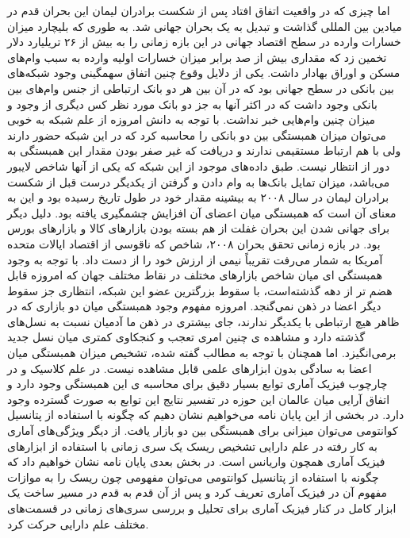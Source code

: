 \documentclass[a4paper,titlepage,12pt,fleqn,oneside]{report}
\begin{document}
	اما چیزی که در واقعیت اتفاق افتاد پس از شکست برادران لیمان این بحران قدم در میادین بین المللی گذاشت و تبدیل به یک بحران جهانی شد.  به طوری که بلیچارد  میزان خسارات وارده در سطح اقتصاد جهانی در این بازه زمانی را به بیش از ۲۶ تریلیارد دلار تخمین زد که مقداری بیش از صد برابر میزان خسارات اولیه وارده به سبب وام‌های مسکن و اوراق بهادار داشت.  
	یکی از دلایل وقوع چنین اتفاق  سهمگینی وجود شبکه‌های بین بانکی در سطح جهانی بود که در آن بین هر دو بانک ارتباطی از جنس وام‌های بین بانکی وجود داشت که در اکثر آنها به جز دو بانک مورد نظر کس دیگری از وجود و میزان چنین وام‌هایی خبر نداشت.  با توجه به دانش امروزه  از علم شبکه به خوبی می‌توان میزان همبستگی بین دو بانکی را محاسبه کرد که در این شبکه حضور دارند ولی با هم ارتباط مستقیمی ندارند و دریافت که غیر صفر بودن مقدار این همبستگی به دور از انتظار نیست.  طبق داده‌های موجود از این شبکه که یکی از آنها شاخص لایبور می‌باشد،  میزان تمایل بانک‌ها به وام دادن و گرفتن از یکدیگر درست قبل از شکست برادران لیمان در سال ۲۰۰۸ به بیشینه مقدار خود در طول تاریخ رسیده بود و این به معنای آن است که همبستگی میان اعضای آن افزایش چشمگیری یافته بود. 
	دلیل دیگر برای جهانی شدن این بحران غفلت از هم بسته بودن بازارهای کالا و بازارهای بورس بود. در بازه زمانی تحقق  بحران ۲۰۰۸،   شاخص  که ناقوسی از اقتصاد ایالات متحده آمریکا به شمار می‌رفت تقریباً نیمی از ارزش خود را از دست داد.  با توجه به وجود همبستگی ای میان شاخص بازارهای مختلف در نقاط مختلف جهان که امروزه قابل هضم تر از دهه گذشته‌است،  با سقوط بزرگترین عضو این شبکه،  انتظاری جز سقوط دیگر اعضا در ذهن نمی‌گنجد.
	امروزه مفهوم وجود همبستگی میان دو بازاری که در ظاهر هیچ ارتباطی با یکدیگر ندارند،  جای بیشتری در ذهن ما آدمیان نسبت به نسل‌های گذشته دارد و مشاهده ی چنین امری تعجب و کنجکاوی کمتری میان نسل جدید برمی‌انگیزد. اما همچنان با توجه به مطالب گفته شده، تشخیص میزان همبستگی میان اعضا به سادگی بدون ابزارهای علمی قابل مشاهده نیست. در علم کلاسیک و در چارچوب فیزیک آماری توابع بسیار دقیق برای محاسبه ی این همبستگی وجود دارد و اتفاق آرایی میان عالمان این حوزه در تفسیر نتایج این توابع به صورت گسترده وجود دارد. در بخشی از این پایان نامه می‌خواهیم نشان دهیم که چگونه با استفاده از پتانسیل کوانتومی می‌توان میزانی برای همبستگی بین دو بازار یافت.  از دیگر ویژگی‌های آماری به کار رفته در علم دارایی تشخیص ریسک یک سری زمانی با استفاده از ابزار‌های فیزیک آماری همچون واریانس است. در بخش بعدی پایان نامه نشان خواهیم داد که چگونه با استفاده از پتانسیل کوانتومی می‌توان  مفهومی چون ریسک را به موازات مفهوم آن در فیزیک آماری تعریف کرد و پس از آن قدم به قدم در مسیر ساخت یک ابزار کامل در کنار فیزیک آماری برای تحلیل و بررسی سری‌های زمانی در قسمت‌های مختلف علم دارایی حرکت کرد.
	\newpage
\end{document}
